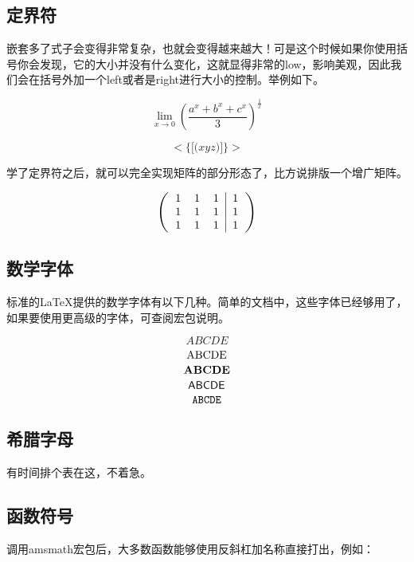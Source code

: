 \subsection{定界符}
嵌套多了式子会变得非常复杂，也就会变得越来越大！可是这个时候如果你使用括号你会发现，它的大小并没有什么变化，这就显得非常的low，影响美观，因此我们会在括号外加一个left或者是right进行大小的控制。举例如下。
\begin{codeshow}
\[
\lim\limits_{x\to 0}\left(\frac
{a^{x}+b^{x}+c^{x}}{3}\right)
^{\tfrac{1}{x}}
\]
\end{codeshow}

\begin{codeshow}
\[ \Bigg< \bigg\{ \Big[ \big( xyz \big) \Big] \bigg\} \Bigg> \]
\end{codeshow}

学了定界符之后，就可以完全实现矩阵的部分形态了，比方说排版一个增广矩阵。

\begin{codeshow}
\[
\left(
\begin{tabular}{ccc|c}
1 & 1 & 1 & 1 \\
1 & 1 & 1 & 1 \\
1 & 1 & 1 & 1 
\end{tabular}
\right)
\]
\end{codeshow}


\subsection{数学字体}
标准的\LaTeX 提供的数学字体有以下几种。简单的文档中，这些字体已经够用了，如果要使用更高级的字体，可查阅\CTeX 宏包说明。
\begin{codeshow}
\[
\mathit{ABCDE}\]
\[
\mathrm{ABCDE}\\\]
\[
\mathbf{ABCDE}\\\]
\[
\mathsf{ABCDE}\\\]
\[
\mathtt{ABCDE}\\\]
\end{codeshow}

\subsection{希腊字母}
有时间排个表在这，不着急。

\subsection{函数符号}
调用amsmath宏包后，大多数函数能够使用反斜杠加名称直接打出，例如：

